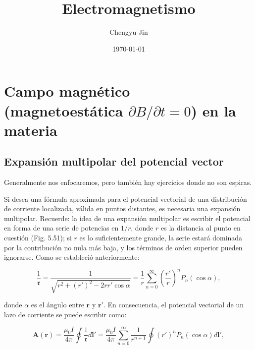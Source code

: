 \documentclass[12pt,a4paper]{report}
\title{Electromagnetismo}
\author{Chengyu Jin}
\date{\today}
\newcommand{\esp}{\vspace{0.5cm}}
\begin{document}
	
	\maketitle
	
	\tableofcontents
	\newpage
	
	\chapter{Campo magnético (magnetoestática $\partial B/\partial t = 0$) en la materia} 
	
	\section{Expansión multipolar del potencial vector}
	
    \begin{nota}
    	Generalmente nos enfocaremos, pero también hay ejercicios donde no son espiras.
    \end{nota}
	
	Si desea una fórmula aproximada para el potencial vectorial de una distribución de corriente localizada, válida en puntos distantes, es necesaria una expansión multipolar. Recuerde: la idea de una expansión multipolar es escribir el potencial en forma de una serie de potencias en $1/r$, donde $r$ es la distancia al punto en cuestión (Fig. 5.51); si $r$ es lo suficientemente grande, la serie estará dominada por la contribución no nula más baja, y los términos de orden superior pueden ignorarse. Como se estableció anteriormente:
	
	\esp
	
	\begin{equation}
		\frac{1}{\mathfrak{r}} = \frac{1}{\sqrt{r^2 + (r')^2 - 2rr' \cos \alpha}} = \frac{1}{r} \sum_{n=0}^{\infty} \left( \frac{r'}{r} \right)^n P_n(\cos \alpha),
	\end{equation}
	
	\esp
	
	\noindent donde $\alpha$ es el ángulo entre $\mathbf{r}$ y $\mathbf{r}'$. En consecuencia, el potencial vectorial de un lazo de corriente se puede escribir como:
	
	\esp
	
	\begin{equation}
		\mathbf{A}(\mathbf{r}) = \frac{\mu_0 I}{4\pi} \oint \frac{1}{\mathfrak{r}} d\mathbf{l}' = \frac{\mu_0 I}{4\pi} \sum_{n=0}^{\infty} \frac{1}{r^{n+1}} \oint (r')^n P_n(\cos \alpha) d\mathbf{l}',
	\end{equation}
	
\end{document}
